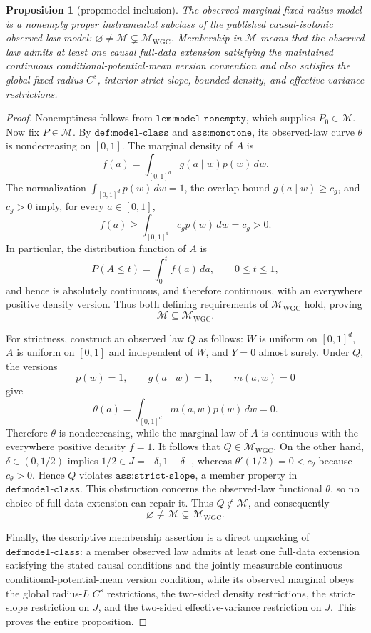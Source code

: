 \documentclass{article}
\newtheorem{proposition}{Proposition}
\begin{document}
\begin{proposition}[prop:model-inclusion]\label{prop:model-inclusion}
The observed-marginal fixed-radius model is a nonempty proper instrumental subclass of the published causal-isotonic observed-law model: \(\varnothing\ne\mathcal M\subsetneq\mathcal M_{\mathrm{WGC}}\). Membership in \(\mathcal M\) means that the observed law admits at least one causal full-data extension satisfying the maintained continuous conditional-potential-mean version convention and also satisfies the global fixed-radius \(C^s\), interior strict-slope, bounded-density, and effective-variance restrictions.
\end{proposition}
\begin{proof}
Nonemptiness follows from \(\texttt{lem:model-nonempty}\), which supplies \(P_0\in\mathcal M\). Now fix \(P\in\mathcal M\). By \(\texttt{def:model-class}\) and \(\texttt{ass:monotone}\), its observed-law curve \(\theta\) is nondecreasing on \([0,1]\). The marginal density of \(A\) is
\[
f(a)=\int_{[0,1]^d}g(a\mid w)p(w)\,dw.
\]
The normalization \(\int_{[0,1]^d}p(w)\,dw=1\), the overlap bound \(g(a\mid w)\ge c_g\), and \(c_g>0\) imply, for every \(a\in[0,1]\),
\[
f(a)
\ge \int_{[0,1]^d}c_g p(w)\,dw
=c_g>0.
\]
In particular, the distribution function of \(A\) is
\[
P(A\le t)=\int_0^t f(a)\,da,
\qquad 0\le t\le1,
\]
and hence is absolutely continuous, and therefore continuous, with an everywhere positive density version. Thus both defining requirements of \(\mathcal M_{\mathrm{WGC}}\) hold, proving
\[
\mathcal M\subseteq\mathcal M_{\mathrm{WGC}}.
\]

For strictness, construct an observed law \(Q\) as follows: \(W\) is uniform on \([0,1]^d\), \(A\) is uniform on \([0,1]\) and independent of \(W\), and \(Y=0\) almost surely. Under \(Q\), the versions
\[
p(w)=1,
\qquad
g(a\mid w)=1,
\qquad
m(a,w)=0
\]
give
\[
\theta(a)=\int_{[0,1]^d}m(a,w)p(w)\,dw=0.
\]
Therefore \(\theta\) is nondecreasing, while the marginal law of \(A\) is continuous with the everywhere positive density \(f=1\). It follows that \(Q\in\mathcal M_{\mathrm{WGC}}\). On the other hand, \(\delta\in(0,1/2)\) implies \(1/2\in J=[\delta,1-\delta]\), whereas \(\theta'(1/2)=0<c_{\theta}\) because \(c_{\theta}>0\). Hence \(Q\) violates \(\texttt{ass:strict-slope}\), a member property in \(\texttt{def:model-class}\). This obstruction concerns the observed-law functional \(\theta\), so no choice of full-data extension can repair it. Thus \(Q\notin\mathcal M\), and consequently
\[
\varnothing\ne\mathcal M\subsetneq\mathcal M_{\mathrm{WGC}}.
\]

Finally, the descriptive membership assertion is a direct unpacking of \(\texttt{def:model-class}\): a member observed law admits at least one full-data extension satisfying the stated causal conditions and the jointly measurable continuous conditional-potential-mean version condition, while its observed marginal obeys the global radius-\(L\) \(C^s\) restrictions, the two-sided density restrictions, the strict-slope restriction on \(J\), and the two-sided effective-variance restriction on \(J\). This proves the entire proposition.
\end{proof}
\end{document}
